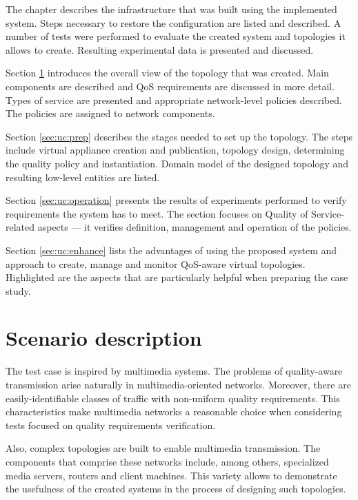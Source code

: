 \documentclass[11pt]{book}
\begin{document}
    The chapter describes the infrastructure that was built using the implemented system. Steps necessary to restore the
    configuration are listed and described. A number of tests were performed to evaluate the created system and
    topologies it allows to create. Resulting experimental data is presented and discussed.

    Section \ref{sec:uc:description} introduces the overall view of the topology that was created. Main components are
    described and QoS requirements are discussed in more detail. Types of service are presented and appropriate
    network-level policies described. The policies are assigned to network components.

    Section \ref{sec:uc:prep} describes the stages needed to set up the topology. The steps include virtual appliance
    creation and publication, topology design, determining the quality policy and instantiation. Domain model of the
    designed topology and resulting low-level entities are listed.

    Section \ref{sec:uc:operation} presents the results of experiments performed to verify requirements the system has
    to meet. The section focuses on Quality of Service-related aspects --- it verifies definition, management and
    operation of the policies.

    Section \ref{sec:uc:enhance} lists the advantages of using the proposed system and approach to create, manage and
    monitor QoS-aware virtual topologies. Highlighted are the aspects that are particularly helpful when preparing the
    case study.


    \section{Scenario description}
    \label{sec:uc:description}

      The test case is inspired by multimedia systems. The problems of quality-aware transmission arise naturally
      in multimedia-oriented networks. Moreover, there are easily-identifiable classes of traffic with non-uniform
      quality requirements. This characteristics make multimedia networks a reasonable choice when considering tests
      focused on quality requirements verification.
      
      Also, complex topologies are built to enable multimedia transmission. The components that comprise these networks
      include, among others, specialized media servers, routers and client machines. This variety allows to demonstrate
      the usefulness of the created systems in the process of designing such topologies.
\end{document}
